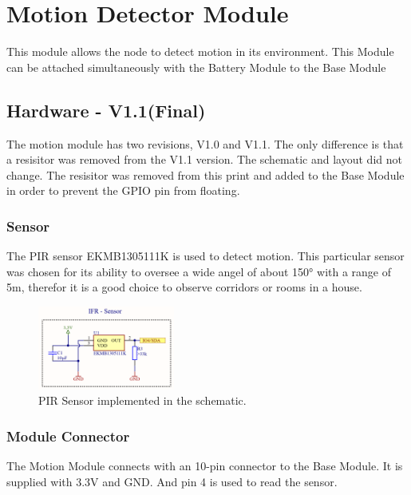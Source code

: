 \section{Motion Detector Module} 

    This module allows the node to detect motion in its environment. This Module can be 
    attached simultaneously with the Battery Module to the Base Module

    \subsection {Hardware - V1.1(Final)}
        The motion module has two revisions, V1.0 and V1.1. The only difference is that 
        a resisitor was removed from the V1.1 version. The schematic and layout did not 
        change. The resisitor was removed from this print and added to the Base Module
        in order to prevent the GPIO pin from floating.
    
    
        

        \subsubsection{Sensor}
            The PIR sensor EKMB1305111K is used to detect motion. This particular sensor was chosen
            for its ability to oversee a wide angel of about 150° with a range of 5m, therefor it is
            a good choice to observe corridors or rooms in a house.

            \begin{figure}[H]
                \centering
                \includegraphics[width=0.4\textwidth]{assets/HW/Motion-IRF.png}
                \caption{PIR Sensor implemented in the schematic.}
            \end{figure}

        \subsubsection{Module Connector}
            The Motion Module connects with an 10-pin connector to the Base Module. It is supplied 
            with 3.3V and GND. And pin 4 is used to read the sensor.

